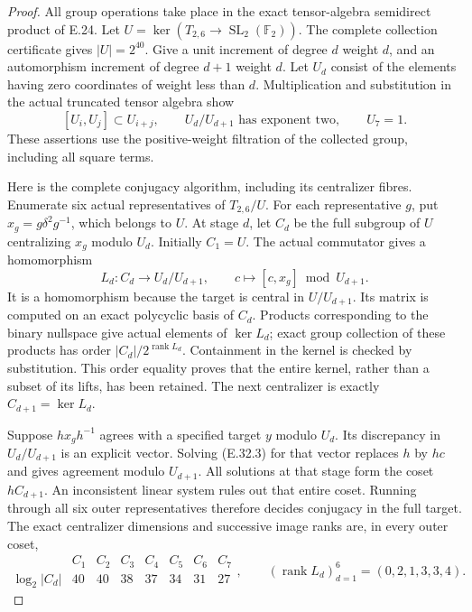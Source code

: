 \begin{proof}
All group operations take place in the exact tensor-algebra
semidirect product of E.24. Let
$U=\ker(T_{2,6}\to\operatorname{SL}_2(\mathbb F_2))$.
The complete collection certificate gives $|U|=2^{40}$.
Give a unit increment of degree $d$ weight $d$, and an
automorphism increment of degree $d+1$ weight $d$.
Let $U_d$ consist of the elements having zero coordinates of
weight less than $d$. Multiplication and substitution in the
actual truncated tensor algebra show
\[
 [U_i,U_j]\subset U_{i+j},\qquad
 U_d/U_{d+1}\text{ has exponent two},\qquad U_7=1.
 \tag{E.32.2}
\]
These assertions use the positive-weight filtration of the
collected group, including all square terms.

Here is the complete conjugacy algorithm, including its
centralizer fibres. Enumerate six actual representatives of
$T_{2,6}/U$. For each representative $g$, put
$x_g=g\delta^2g^{-1}$, which belongs to $U$.
At stage $d$, let $C_d$ be the full subgroup of $U$ centralizing
$x_g$ modulo $U_d$. Initially $C_1=U$.
The actual commutator gives a homomorphism
\[
 L_d:C_d\longrightarrow U_d/U_{d+1},\qquad
 c\longmapsto[c,x_g]\bmod U_{d+1}.
 \tag{E.32.3}
\]
It is a homomorphism because the target is central in
$U/U_{d+1}$. Its matrix is computed on an exact polycyclic
basis of $C_d$. Products corresponding to the binary nullspace
give actual elements of $\ker L_d$; exact group collection of
these products has order
$|C_d|/2^{\operatorname{rank}L_d}$. Containment in the kernel
is checked by substitution. This order equality proves that
the entire kernel, rather than a subset of its lifts, has been
retained. The next centralizer is exactly
$C_{d+1}=\ker L_d$.

Suppose $h x_g h^{-1}$ agrees with a specified target $y$ modulo
$U_d$. Its discrepancy in $U_d/U_{d+1}$ is an explicit vector.
Solving (E.32.3) for that vector replaces $h$ by $hc$ and gives
agreement modulo $U_{d+1}$. All solutions at that stage form
the coset $hC_{d+1}$. An inconsistent linear system rules out
that entire coset. Running through all six outer representatives
therefore decides conjugacy in the full target. The exact
centralizer dimensions and successive image ranks are, in
every outer coset,
\[
 \begin{array}{c|rrrrrrr}
  &C_1&C_2&C_3&C_4&C_5&C_6&C_7\\\hline
  \log_2|C_d|&40&40&38&37&34&31&27
 \end{array},
 \qquad
 (\operatorname{rank}L_d)_{d=1}^6=(0,2,1,3,3,4).
 \tag{E.32.4}
\]


\end{proof}
